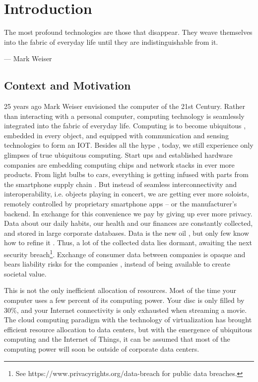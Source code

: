 \chapter{Introduction}
\label{sec:introduction}

\epigraph{The most profound technologies are those that disappear. They weave themselves into the
fabric of everyday life until they are indistinguishable from it.}{--- \textup{Mark Weiser}}

\section{Context and Motivation}

25 years ago Mark Weiser envisioned the computer of the 21st Century. Rather than interacting with a personal computer, computing technology is seamlessly integrated into the fabric of everyday life. Computing is to become ubiquitous \parencite{weiser:13609162}, embedded in every object, and equipped with communication and sensing technologies to form an \ac{IOT}.
Besides all the hype \parencite{Gartner:2015,manyika2015unlocking}, today, we still experience only glimpses of true ubiquitous computing. Start ups and established hardware companies are embedding computing chips and network stacks in ever more products. From light bulbs to cars, everything is getting infused with parts from the smartphone supply chain \parencite{Evans:2015,Evans:2016}. But instead of seamless interconnectivity and interoperability, i.e. objects playing in concert, we are getting ever more soloists, remotely controlled by proprietary smartphone apps -- or the manufacturer's backend. In exchange for this convenience we pay by giving up ever more privacy. Data about our daily habits, our health and our finances are constantly collected, and stored in large corporate databases. Data is the new oil \parencite{schwab2011personal}, but only few know how to refine it \parencite{manyika2015unlocking}. Thus, a lot of the collected data lies dormant, awaiting the next security breach\footnote{See https://www.privacyrights.org/data-breach for public data breaches.}. Exchange of consumer data between companies is opaque and bears liability risks for the companies \parencite{ISI:000330253700010}, instead of being available to create societal value.

This is not the only inefficient allocation of resources. Most of the time your computer uses a few percent of its computing power. Your disc is only filled by 30\%, and your Internet connectivity is only exhausted when streaming a movie. The cloud computing paradigm \parencite{Hayes:2008:CC:1364782.1364786,Armbrust:2010:VCC:1721654.1721672} with the technology of virtualization \parencite{barham2003xen} has brought efficient resource allocation to data centers, but with the emergence of ubiquitous computing and the Internet of Things, it can be assumed that most of the computing power will soon be outside of corporate data centers. 


